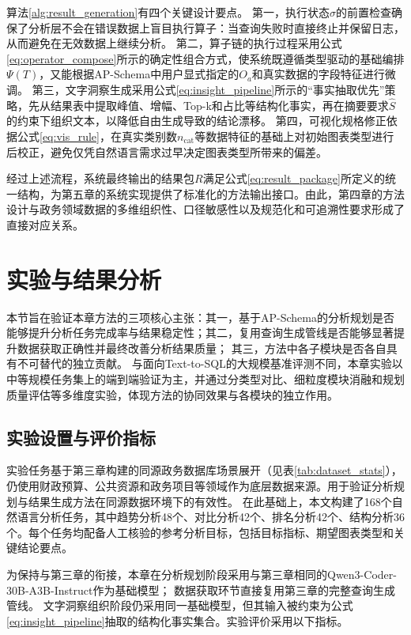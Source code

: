 算法\ref{alg:result_generation}有四个关键设计要点。
第一，执行状态$\sigma$的前置检查确保了分析层不会在错误数据上盲目执行算子：当查询失败时直接终止并保留日志，从而避免在无效数据上继续分析。
第二，算子链的执行过程采用公式\eqref{eq:operator_compose}所示的确定性组合方式，使系统既遵循类型驱动的基础编排$\Psi(T)$，又能根据AP-Schema中用户显式指定的$O_a$和真实数据的字段特征进行微调。
第三，文字洞察生成采用公式\eqref{eq:insight_pipeline}所示的“事实抽取优先”策略，先从结果表中提取峰值、增幅、Top-k和占比等结构化事实，再在摘要要求$\hat{S}$的约束下组织文本，以降低自由生成导致的结论漂移。
第四，可视化规格修正依据公式\eqref{eq:vis_rule}，在真实类别数$n_{\text{cat}}$等数据特征的基础上对初始图表类型进行后校正，避免仅凭自然语言需求过早决定图表类型所带来的偏差。

经过上述流程，系统最终输出的结果包$R$满足公式\eqref{eq:result_package}所定义的统一结构，为第五章的系统实现提供了标准化的方法输出接口。由此，第四章的方法设计与政务领域数据的多维组织性、口径敏感性以及规范化和可追溯性要求形成了直接对应关系。



\section{实验与结果分析}

本节旨在验证本章方法的三项核心主张：其一，基于AP-Schema的分析规划是否能够提升分析任务完成率与结果稳定性；其二，复用查询生成管线是否能够显著提升数据获取正确性并最终改善分析结果质量；
其三，方法中各子模块是否各自具有不可替代的独立贡献。
与面向Text-to-SQL的大规模基准评测不同，本章实验以中等规模任务集上的端到端验证为主，并通过分类型对比、细粒度模块消融和规划质量评估等多维度实验，体现方法的协同效果与各模块的独立作用。

\subsection{实验设置与评价指标}

实验任务基于第三章构建的同源政务数据库场景展开（见表\ref{tab:dataset_stats}），仍使用财政预算、公共资源和政务项目等领域作为底层数据来源。用于验证分析规划与结果生成方法在同源数据环境下的有效性。
在此基础上，本文构建了168个自然语言分析任务，其中趋势分析48个、对比分析42个、排名分析42个、结构分析36个。每个任务均配备人工核验的参考分析目标，包括目标指标、期望图表类型和关键结论要点。

为保持与第三章的衔接，本章在分析规划阶段采用与第三章相同的Qwen3-Coder-30B-A3B-Instruct作为基础模型；
数据获取环节直接复用第三章的完整查询生成管线。
文字洞察组织阶段仍采用同一基础模型，但其输入被约束为公式\eqref{eq:insight_pipeline}抽取的结构化事实集合。实验评价采用以下指标。

